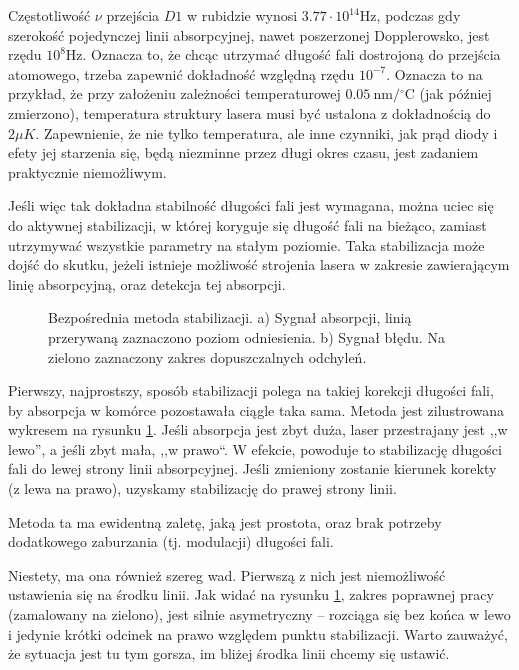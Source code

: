 \documentclass[a4paper,10pt]{article}
\begin{document}
Częstotliwość $\nu$ przejścia $D1$ w rubidzie wynosi $3.77 \cdot 10^{14} 
\mathrm{Hz}$, podczas gdy szerokość pojedynczej linii absorpcyjnej,
nawet poszerzonej Dopplerowsko, jest rzędu $10^8 \mathrm{Hz}$. Oznacza to, że 
chcąc utrzymać długość fali dostrojoną do przejścia atomowego,
trzeba zapewnić dokładność względną rzędu $10^{-7}$. Oznacza to na przykład, że przy założeniu zależności temperaturowej $0.05 ~\mathrm{nm/{}^{\circ}C}$ (jak później zmierzono), temperatura struktury lasera musi być ustalona z dokładnością do $2\mu K$. Zapewnienie,
że nie tylko temperatura, ale inne czynniki, jak prąd diody i efety jej 
starzenia się, będą niezminne przez długi okres czasu, jest zadaniem 
praktycznie niemożliwym.

Jeśli więc tak dokładna stabilność długości fali jest wymagana, można uciec się do aktywnej 
stabilizacji, w której koryguje się długość fali na bieżąco, zamiast utrzymywać 
wszystkie parametry na stałym poziomie.
Taka stabilizacja może dojść do skutku, jeżeli istnieje możliwość strojenia 
lasera w zakresie zawierającym linię absorpcyjną, oraz detekcja tej absorpcji.

\begin{figure}
\caption{Bezpośrednia metoda stabilizacji. a) Sygnał absorpcji, linią przerywaną zaznaczono poziom odniesienia. b) Sygnał błędu. Na zielono zaznaczony zakres dopuszczalnych odchyleń.}
\label{fig:lock1}
\end{figure} 


Pierwszy, najprostszy, sposób stabilizacji polega na takiej korekcji długości 
fali, by absorpcja w komórce pozostawała ciągle taka sama.
Metoda jest zilustrowana wykresem na rysunku \ref{fig:lock1}. Jeśli absorpcja 
jest zbyt duża, laser przestrajany jest ,,w lewo'', a jeśli zbyt mała, ,,w 
prawo``.
W efekcie, powoduje to stabilizację długości fali do lewej strony linii absorpcyjnej.
Jeśli zmieniony zostanie kierunek korekty (z lewa na prawo), uzyskamy stabilizację do prawej strony linii.

Metoda ta ma ewidentną zaletę, jaką jest prostota, oraz brak potrzeby dodatkowego zaburzania (tj. modulacji) długości fali.

Niestety, ma ona również szereg wad. Pierwszą z nich jest niemożliwość ustawienia się na środku linii. Jak widać na
rysunku \ref{fig:lock1}, zakres poprawnej pracy (zamalowany na zielono), jest silnie asymetryczny -- rozciąga się 
bez końca w lewo i jedynie krótki odcinek na prawo względem punktu stabilizacji. Warto zauważyć, że sytuacja jest tu tym gorsza, im
bliżej środka linii chcemy się ustawić.
\end{document}
